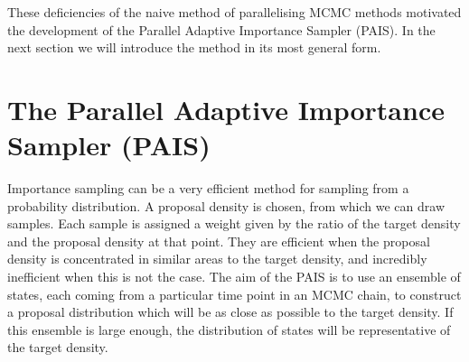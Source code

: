 \documentclass[final]{siamltex}
\begin{document}
These deficiencies of the naive method of parallelising MCMC methods
motivated the development of the Parallel Adaptive Importance Sampler
(PAIS). In the next section we will introduce the method in its most
general form.

\section{The Parallel Adaptive Importance Sampler \allowbreak (PAIS)}\label{Sec:PAIS}



Importance sampling can be a very efficient method for sampling from a
probability distribution. A proposal density is chosen, from which we
can draw samples. Each sample is assigned a weight given by the
ratio of the target density and the proposal density at that
point. They are efficient when the proposal density is concentrated in
similar areas to the target density, and incredibly inefficient when
this is not the case. The aim of the PAIS is to use an ensemble of states,
each coming from a particular time point in an MCMC chain, to construct a proposal
distribution which will be as close as possible to the target density. If this
ensemble is large enough, the distribution of states will be representative
of the target density.
\end{document}
